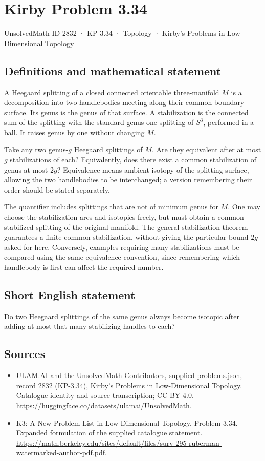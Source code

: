 \documentclass[11pt,a4paper]{article}
\begin{document}
\section*{Kirby Problem 3.34}\label{2832}
{\small UnsolvedMath ID 2832 · KP-3.34 · Topology · Kirby's Problems in Low-Dimensional Topology}
\subsection{Definitions and mathematical statement}
A Heegaard splitting of a closed connected orientable three-manifold $M$
is a decomposition into two handlebodies meeting along their common
boundary surface. Its genus is the genus of that surface. A stabilization
is the connected sum of the splitting with the standard genus-one splitting
of $S^3$, performed in a ball. It raises genus by one without changing $M$.

Take any two genus-$g$ Heegaard splittings of $M$. Are they equivalent
after at most $g$ stabilizations of each? Equivalently, does there exist a
common stabilization of genus at most $2g$? Equivalence means ambient
isotopy of the splitting surface, allowing the two handlebodies to be
interchanged; a version remembering their order should be stated separately.

The quantifier includes splittings that are not of minimum genus for $M$.
One may choose the stabilization arcs and isotopies freely, but must obtain
a common stabilized splitting of the original manifold. The general
stabilization theorem guarantees a finite common stabilization, without
giving the particular bound $2g$ asked for here. Conversely, examples
requiring many stabilizations must be compared using the same equivalence
convention, since remembering which handlebody is first can affect the
required number.
\subsection{Short English statement}
Do two Heegaard splittings of the same genus always become isotopic after adding at most that many stabilizing handles to each?
\subsection{Sources}
\begin{itemize}
\item[S1] ULAM.AI and the UnsolvedMath Contributors, supplied problems.json, record 2832 (KP-3.34), Kirby's Problems in Low-Dimensional Topology. Catalogue identity and source transcription; CC BY 4.0.
\url{https://huggingface.co/datasets/ulamai/UnsolvedMath}.
\item[S2] K3: A New Problem List in Low-Dimensional Topology, Problem 3.34. Expanded formulation of the supplied catalogue statement.
\url{https://math.berkeley.edu/sites/default/files/surv-295-ruberman-watermarked-author-pdf.pdf}.
\end{itemize}
\end{document}
